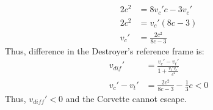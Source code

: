 \documentclass{article}
\begin{document}
\begin{itemize}
\begin{itemize}
\begin{align*}
            2c^2 &= 8v_c'c-3v_c'\\
            2c^2 &= v_c'(8c-3)\\
            v_c' &= \frac{2c^2}{8c-3} 
        \end{align*}
        Thus, difference in the Destroyer's reference frame is:\\
        \begin{align*}
            v_{dif}' &= \frac{v_c'-v_t'}{1+\frac{v_t'v_c'}{c^2}}\\
            v_c'-v_t'&= \frac{2c^2}{8c-3} - \frac{1}{3}c <0
        \end{align*}
        Thus, \(v_{diff}'<0\) and the Corvette cannot escape.
    \end{itemize}
\end{itemize}
\end{document}
